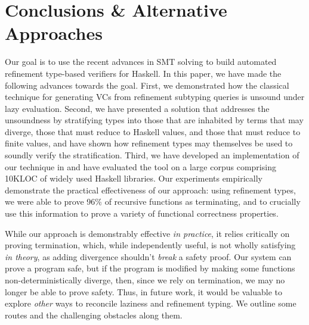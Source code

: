 \section{Conclusions \& Alternative Approaches}\label{sec:refinedhaskell:conclusion}

Our goal is to use the recent advances in SMT solving to 
build automated refinement type-based verifiers for 
Haskell.
%
In this paper, we have made the following advances 
towards the goal. 
%
First, we demonstrated how the classical technique
for generating VCs from refinement subtyping queries
is unsound under lazy evaluation.
%
Second, we have presented a solution that addresses 
the unsoundness by stratifying types into those that 
are inhabited by terms that may diverge, those that must reduce 
to Haskell values, and those that must reduce to finite values, 
and have shown how refinement types may themselves 
be used to soundly verify the stratification. 
%
Third, we have developed an implementation of our 
technique in \toolname and have evaluated the tool 
on a large corpus comprising 10KLOC of widely used 
Haskell libraries. Our experiments empirically 
demonstrate the practical effectiveness of our
approach: using refinement types, we were able 
to prove 96\% of recursive functions as 
terminating, and to crucially use this information 
to prove a variety of functional correctness properties.

While our approach is demonstrably effective 
\emph{in practice}, it relies critically on 
proving termination, which, while independently 
useful, is not wholly satisfying 
\emph{in theory}, as adding divergence shouldn't 
\emph{break} a safety proof.
%
Our system can prove a program safe, 
but if the program is modified by making 
some functions non-deterministically diverge,
then, since we rely on termination, we
may no longer be able to prove safety.
%
Thus, in future work, it would be valuable to 
explore \emph{other} ways to reconcile laziness 
and refinement typing. We outline some routes 
and the challenging obstacles along them.



